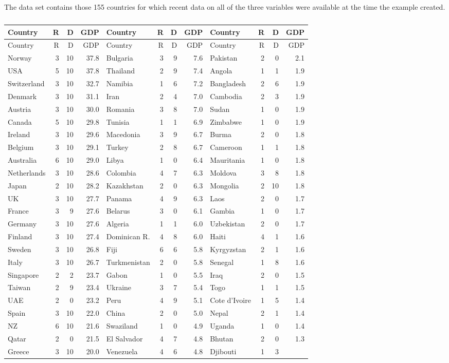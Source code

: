 \documentclass[11pt,a4paper,openany]{book}
\begin{document}
The data set contains those 155 countries for which recent data on all
of the three variables were available at the time the example created.

\begin{longtable}[]{@{}lrrrlrrrlrrr@{}}
\caption{\label{tab:t-countrydata}}\tabularnewline
\toprule
Country & R & D & GDP & Country & R & D & GDP & Country & R & D &
GDP\tabularnewline
\midrule
\endfirsthead
\toprule
Country & R & D & GDP & Country & R & D & GDP & Country & R & D &
GDP\tabularnewline
\midrule
\endhead
Norway & 3 & 10 & 37.8 & Bulgaria & 3 & 9 & 7.6 & Pakistan & 2 & 0 &
2.1\tabularnewline
USA & 5 & 10 & 37.8 & Thailand & 2 & 9 & 7.4 & Angola & 1 & 1 &
1.9\tabularnewline
Switzerland & 3 & 10 & 32.7 & Namibia & 1 & 6 & 7.2 & Bangladesh & 2 & 6
& 1.9\tabularnewline
Denmark & 3 & 10 & 31.1 & Iran & 2 & 4 & 7.0 & Cambodia & 2 & 3 &
1.9\tabularnewline
Austria & 3 & 10 & 30.0 & Romania & 3 & 8 & 7.0 & Sudan & 1 & 0 &
1.9\tabularnewline
Canada & 5 & 10 & 29.8 & Tunisia & 1 & 1 & 6.9 & Zimbabwe & 1 & 0 &
1.9\tabularnewline
Ireland & 3 & 10 & 29.6 & Macedonia & 3 & 9 & 6.7 & Burma & 2 & 0 &
1.8\tabularnewline
Belgium & 3 & 10 & 29.1 & Turkey & 2 & 8 & 6.7 & Cameroon & 1 & 1 &
1.8\tabularnewline
Australia & 6 & 10 & 29.0 & Libya & 1 & 0 & 6.4 & Mauritania & 1 & 0 &
1.8\tabularnewline
Netherlands & 3 & 10 & 28.6 & Colombia & 4 & 7 & 6.3 & Moldova & 3 & 8 &
1.8\tabularnewline
Japan & 2 & 10 & 28.2 & Kazakhstan & 2 & 0 & 6.3 & Mongolia & 2 & 10 &
1.8\tabularnewline
UK & 3 & 10 & 27.7 & Panama & 4 & 9 & 6.3 & Laos & 2 & 0 &
1.7\tabularnewline
France & 3 & 9 & 27.6 & Belarus & 3 & 0 & 6.1 & Gambia & 1 & 0 &
1.7\tabularnewline
Germany & 3 & 10 & 27.6 & Algeria & 1 & 1 & 6.0 & Uzbekistan & 2 & 0 &
1.7\tabularnewline
Finland & 3 & 10 & 27.4 & Dominican R. & 4 & 8 & 6.0 & Haiti & 4 & 1 &
1.6\tabularnewline
Sweden & 3 & 10 & 26.8 & Fiji & 6 & 6 & 5.8 & Kyrgyzstan & 2 & 1 &
1.6\tabularnewline
Italy & 3 & 10 & 26.7 & Turkmenistan & 2 & 0 & 5.8 & Senegal & 1 & 8 &
1.6\tabularnewline
Singapore & 2 & 2 & 23.7 & Gabon & 1 & 0 & 5.5 & Iraq & 2 & 0 &
1.5\tabularnewline
Taiwan & 2 & 9 & 23.4 & Ukraine & 3 & 7 & 5.4 & Togo & 1 & 1 &
1.5\tabularnewline
UAE & 2 & 0 & 23.2 & Peru & 4 & 9 & 5.1 & Cote d'Ivoire & 1 & 5 &
1.4\tabularnewline
Spain & 3 & 10 & 22.0 & China & 2 & 0 & 5.0 & Nepal & 2 & 1 &
1.4\tabularnewline
NZ & 6 & 10 & 21.6 & Swaziland & 1 & 0 & 4.9 & Uganda & 1 & 0 &
1.4\tabularnewline
Qatar & 2 & 0 & 21.5 & El Salvador & 4 & 7 & 4.8 & Bhutan & 2 & 0 &
1.3\tabularnewline
Greece & 3 & 10 & 20.0 & Venezuela & 4 & 6 & 4.8 & Djibouti & 1 & 3 &

\end{longtable}
\end{document}
